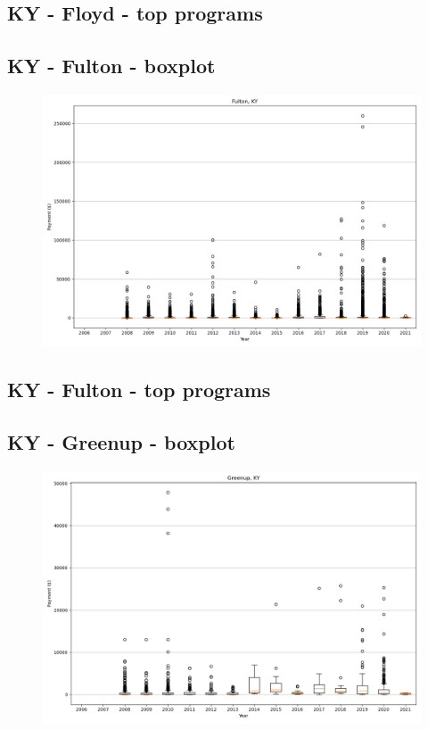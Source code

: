 \subsection*{KY - Floyd - top programs}

\newpage
\subsection*{KY - Fulton - boxplot}
\begin{figure}[h]
\centering
\includegraphics[width=7in]{../output/boxplots/counties/Fulton-KY_boxplot.png}
\end{figure}


\subsection*{KY - Fulton - top programs}

\newpage
\subsection*{KY - Greenup - boxplot}
\begin{figure}[h]
\centering
\includegraphics[width=7in]{../output/boxplots/counties/Greenup-KY_boxplot.png}
\end{figure}


